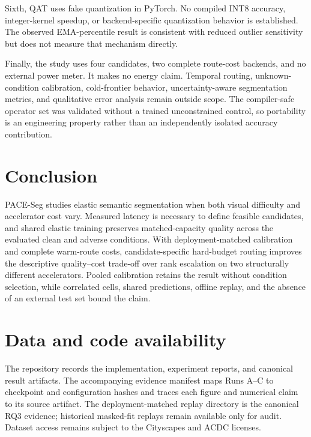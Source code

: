 \documentclass[a4paper,review,12pt]{elsarticle}
\newcommand{\method}{PACE-Seg}
\begin{document}
Sixth, QAT uses fake quantization in PyTorch. No compiled INT8 accuracy, integer-kernel speedup, or backend-specific quantization behavior is established. The observed EMA-percentile result is consistent with reduced outlier sensitivity but does not measure that mechanism directly.

Finally, the study uses four candidates, two complete route-cost backends, and no external power meter. It makes no energy claim. Temporal routing, unknown-condition calibration, cold-frontier behavior, uncertainty-aware segmentation metrics, and qualitative error analysis remain outside scope. The compiler-safe operator set was validated without a trained unconstrained control, so portability is an engineering property rather than an independently isolated accuracy contribution.

\section{Conclusion}
\label{sec:conclusion}

\method{} studies elastic semantic segmentation when both visual difficulty and accelerator cost vary. Measured latency is necessary to define feasible candidates, and shared elastic training preserves matched-capacity quality across the evaluated clean and adverse conditions. With deployment-matched calibration and complete warm-route costs, candidate-specific hard-budget routing improves the descriptive quality--cost trade-off over rank escalation on two structurally different accelerators. Pooled calibration retains the result without condition selection, while correlated cells, shared predictions, offline replay, and the absence of an external test set bound the claim.

\section*{Data and code availability}

The repository records the implementation, experiment reports, and canonical result artifacts. The accompanying evidence manifest maps Runs A--C to checkpoint and configuration hashes and traces each figure and numerical claim to its source artifact. The deployment-matched replay directory is the canonical RQ3 evidence; historical masked-fit replays remain available only for audit. Dataset access remains subject to the Cityscapes and ACDC licenses.
\end{document}
